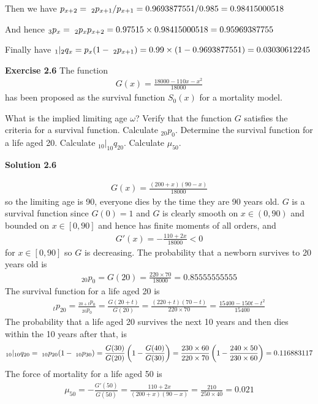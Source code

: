 \documentclass[hidelinks, 12pt]{article}
\theoremstyle{mydefstyle}
\theoremstyle{mythmstyle}
\newcounter{prop}
\begin{document}
Then we have $p_{x+2} = \hspace{1mm}_2p_{x+1} / p_{x+1} = 0.9693877551 / 0.985 = 0.98415000518$

And hence $_3p_x = \hspace{1mm}_2p_x p_{x+2} = 0.97515 \times 0.98415000518 = 0.95969387755$

Finally have $_1\vert_2 q_x = p_x (1 - \hspace{1mm}_2p_{x+1}) = 0.99 \times (1 - 0.9693877551) = 0.03030612245$

\textbf{Exercise 2.6} The function
\begin{gather*}
G(x) = \frac{18000 - 110x - x^2}{18000}
\end{gather*}
has been proposed as the survival function $S_0(x)$ for a mortality model.

What is the implied limiting age $\omega$? Verify that the function $G$ satisfies the criteria for a survival function. Calculate $_{20}p_0$. Determine the survival function for a life aged 20. Calculate $_{10}\vert_{10}q_{20}$. Calculate $\mu_{50}$.

\textbf{Solution 2.6}

\begin{gather*}
G(x) = \frac{(200 + x)(90 - x)}{18000}
\end{gather*}
so the limiting age is 90, everyone dies by the time they are 90 years old. $G$ is a survival function since $G(0) = 1$ and $G$ is clearly smooth on $x \in (0, 90)$ and bounded on $x \in [0, 90]$ and hence has finite moments of all orders, and
\begin{gather*}
G'(x) = -\frac{110 + 2x}{18000} < 0
\end{gather*}
for $x \in [0, 90]$ so $G$ is decreasing. The probability that a newborn survives to 20 years old is
\begin{gather*}
_{20}p_0 = G(20) = \frac{220 \times 70}{18000} = 0.85555555555
\end{gather*}
The survival function for a life aged 20 is
\begin{gather*}
_tp_{20} = \frac{_{20+t}p_0}{_{20}p_0} = \frac{G(20+t)}{G(20)} = \frac{(220 + t)(70 - t)}{220 \times 70} = \frac{15400 - 150 t - t^2}{15400}
\end{gather*}
The probability that a life aged 20 survives the next 10 years and then dies within the 10 years after that, is
\begin{gather*}
_{10}\vert_{10}q_{20} = \hspace{1mm}_{10}p_{20} (1 - \hspace{1mm}_{10}p_{30})
= \frac{G(30)}{G(20)} \left(1 - \frac{G(40)}{G(30)}\right)
= \frac{230 \times 60}{220 \times 70} \left(1 - \frac{240 \times 50}{230 \times 60}\right)
= 0.116883117
\end{gather*}
The force of mortality for a life aged 50 is
\begin{gather*}
\mu_{50} = -\frac{G'(50)}{G(50)} = \frac{110 + 2x}{(200+x)(90-x)} = \frac{210}{250 \times 40} = 0.021
\end{gather*}
\end{document}
